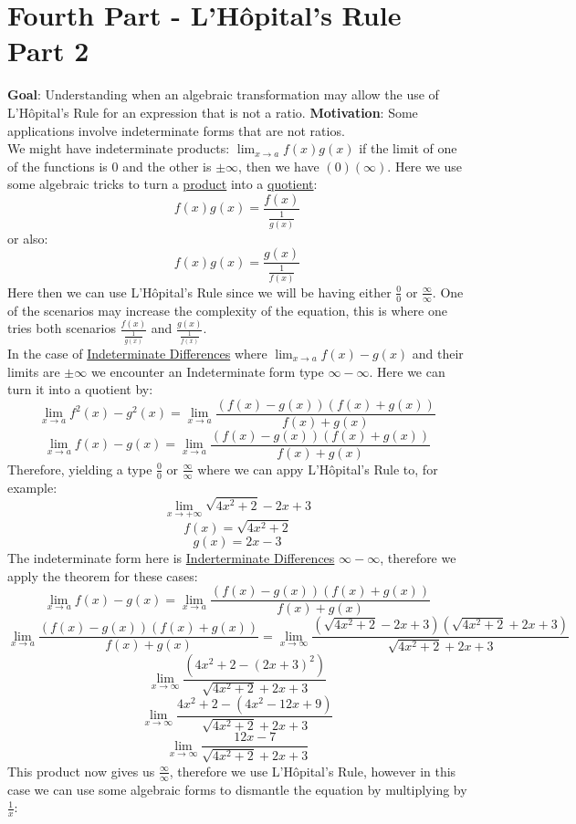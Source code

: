 \documentclass[12pt, letterpaper]{article}
\begin{document}
\section{Fourth Part - L'Hôpital's Rule Part 2}
\textbf{Goal}: Understanding when an algebraic transformation may allow the use of L'Hôpital's Rule for an expression that is not a ratio.
\textbf{Motivation}: Some applications involve indeterminate forms that are not ratios.\\
\newline
We might have indeterminate products: \(\lim_{x \to a} f(x)g(x)\) if the limit of one of the functions is \(0\) and the other is \(\pm \infty\), then we have \((0) (\infty)\). Here we use some algebraic tricks to turn a \underline{product} into a \underline{quotient}:
\[f(x)g(x) = \frac{f(x)}{\frac{1}{g(x)}}\]
or also: 
\[f(x)g(x) = \frac{g(x)}{\frac{1}{f(x)}}\]
Here then we can use L'Hôpital's Rule since we will be having either \(\frac{0}{0}\) or \(\frac{\infty}{\infty}\). One of the scenarios may increase the complexity of the equation, this is where one tries both scenarios \(\frac{f(x)}{\frac{1}{g(x)}}\) and \(\frac{g(x)}{\frac{1}{f(x)}}\).\\
\newline
In the case of \underline{Indeterminate Differences} where \(\lim_{x \to a} f(x)-g(x)\) and their limits are \(\pm \infty\) we encounter an Indeterminate form type \(\infty - \infty\). Here we can turn it into a quotient by:
\[\lim_{x \to a} f^2(x)-g^2(x) = \lim_{x \to a} \frac{(f(x)-g(x))(f(x)+g(x))}{f(x)+g(x)}\]
\[\lim_{x \to a} f(x)-g(x) = \lim_{x \to a} \frac{(f(x)-g(x))(f(x)+g(x))}{f(x)+g(x)}\]
Therefore, yielding a type \(\frac{0}{0}\) or \(\frac{\infty}{\infty}\) where we can appy L'Hôpital's Rule to, for example:
\[\lim_{x \to +\infty} \sqrt{4x^2+2} - 2x+3\]
\[f(x)=\sqrt{4x^2+2}\]
\[g(x)=2x-3\]
The indeterminate form here is \underline{Inderterminate Differences} \(\infty-\infty\), therefore we apply the theorem for these cases:
\[\lim_{x \to a} f(x)-g(x) = \lim_{x \to a} \frac{(f(x)-g(x))(f(x)+g(x))}{f(x)+g(x)}\]
\[\lim_{x \to a} \frac{(f(x)-g(x))(f(x)+g(x))}{f(x)+g(x)} = \lim_{x \to \infty} \frac{(\sqrt{4x^2+2} - 2x+3)(\sqrt{4x^2+2} + 2x+3)}{\sqrt{4x^2+2} + 2x+3}\]
\[\lim_{x \to \infty} \frac{(4x^2+2 - (2x+3)^2)}{\sqrt{4x^2+2} + 2x+3}\]
\[\lim_{x \to \infty} \frac{4x^2+2 - (4x^2-12x+9)}{\sqrt{4x^2+2} + 2x+3}\]
\[\lim_{x \to \infty} \frac{12x-7}{\sqrt{4x^2+2} + 2x+3}\]
This product now gives us \(\frac{\infty}{\infty}\), therefore we use L'Hôpital's Rule, however in this case we can use some algebraic forms to dismantle the equation by multiplying by \(\frac{1}{x}\):
\end{document}
